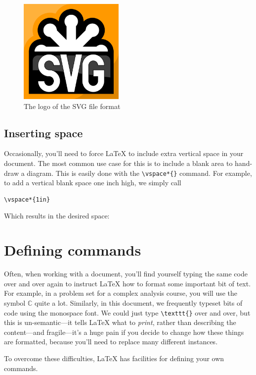\documentclass{article}
\newcommand*{\code}[1]{\texttt{#1}}
\begin{document}
\begin{figure}[htb]
  \centering
  \includegraphics[width=2in]{logo}
  \caption{The logo of the SVG file format}
  \label{fig:svg}
\end{figure}

\subsection{Inserting space}
\label{s:space}
Occasionally, you'll need to force \LaTeX{} to include extra vertical space in your document.
The most common use case for this is to include a blank area to hand-draw a diagram.
This is easily done with the \code{\textbackslash{}vspace*\{\}} command.
For example, to add a vertical blank space one inch high, we simply call
\begin{verbatim}
\vspace*{1in}
\end{verbatim}
Which results in the desired space:
\vspace*{1in}

\section{Defining commands}
Often, when working with a document, you'll find yourself typing the same code over and over again to instruct \LaTeX{} how to format some important bit of text.
For example, in a problem set for a complex analysis course, you will use the symbol $\mathbb{C}$ quite a lot.
Similarly, in this document, we frequently typeset bits of code using the monospace font.
We could just type \code{\textbackslash{}texttt\{\}} over and over, but this is un-semantic---it tells \LaTeX{} what to \emph{print}, rather than describing the content---and fragile---it's a huge pain if you decide to change how these things are formatted, because you'll need to replace many different instances.

To overcome these difficulties, \LaTeX{} has facilities for defining your own commands.
\end{document}
